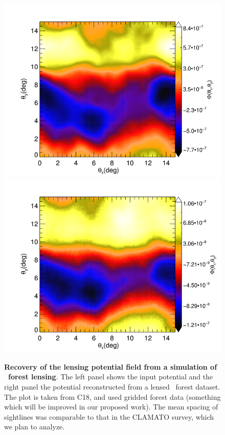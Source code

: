 \begin{figure}
  \begin{center}
    \includegraphics[scale=0.3]{figs/GRP_512_15_z1.png}
    \includegraphics[scale=0.3]{figs/GRP_512_15_z1_Recov.png}
  \end{center}
  \caption{ \footnotesize
{\bf Recovery of the lensing potential field from a simulation of \lya\ forest
lensing}. The left panel shows the input potential and the right panel
the potential reconstructed from a lensed \lya\ forest dataset. The plot is taken from C18, and used gridded forest data (something which will
be improved in our proposed work). The mean spacing of sightlines was 
comparable to that in the CLAMATO survey, which we plan to analyze.
           }
  \label{recon}
\end{figure}

